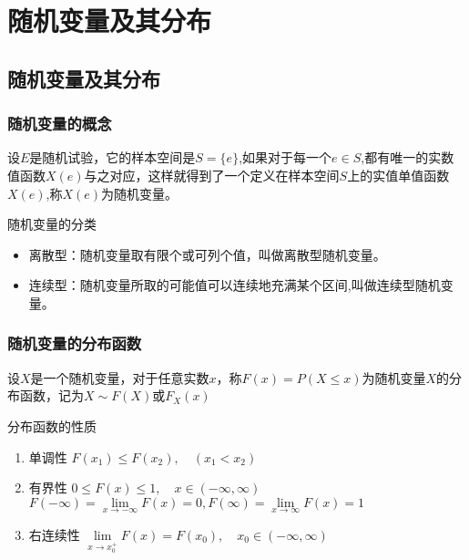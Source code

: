\chapter{随机变量及其分布}
\section{随机变量及其分布}
\subsection{随机变量的概念}
\begin{definition}
    设$E$是随机试验，它的样本空间是$S=\{e\}$,如果对于每一个$e\in S$,都有唯一的实数值函数$X(e)$与之对应，这样就得到了一个定义在样本空间$S$上的实值单值函数$X(e)$,称$X(e)$为随机变量。
\end{definition}

随机变量的分类
\begin{itemize}
    \item 离散型：随机变量取有限个或可列个值，叫做离散型随机变量。
    \item 连续型：随机变量所取的可能值可以连续地充满某个区间,叫做连续型随机变量。
\end{itemize}

\subsection{随机变量的分布函数}
\begin{definition}
    设$X$是一个随机变量，对于任意实数$x$，称$F(x)=P(X\leq x)$为随机变量$X$的分布函数，记为$X \sim F(X)$或$F_X(x)$
\end{definition}

\begin{property} 分布函数的性质
    \begin{enumerate}
        \item 单调性 $F({x_1}) \leqslant F({x_2}),\quad ({x_1} < {x_2})$
        \item 有界性 $0 \leqslant F(x) \leqslant 1,\quad x \in ( - \infty ,\infty )$
              $F( - \infty ) = \mathop {\lim }\limits_{x \to  - \infty } F(x) = 0,F(\infty ) = \mathop {\lim }\limits_{x \to \infty } F(x) = 1$
        \item 右连续性 $\mathop {\lim }\limits_{x \to x_0^+} F(x) = F(x_0),\quad {x_0} \in ( - \infty ,\infty )$
    \end{enumerate}

\end{property}

